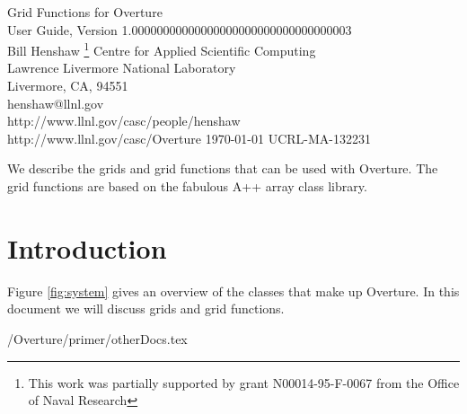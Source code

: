 \documentclass{article}
\newcommand{\primer}{\homeHenshaw/Overture/primer}
\begin{document}


\def\comma  {~~~,~~}
\def\uvd    {{\bf U}}
\def\ud     {{    U}}
\def\pd     {{    P}}
\def\calo{{\cal O}}


\vspace{5\baselineskip}
\begin{flushleft}
{\Large
Grid Functions for Overture\\
User Guide, Version 1.00000000000000000000000000000000003 \\
}
\vspace{2\baselineskip}
Bill Henshaw
\footnote{
        This work was partially
        supported by grant N00014-95-F-0067 from the Office of Naval
        Research
        } 
\vspace{\baselineskip}
Centre for Applied Scientific Computing \\
Lawrence Livermore National Laboratory    \\
Livermore, CA, 94551   \\
henshaw@llnl.gov \\
http://www.llnl.gov/casc/people/henshaw \\
http://www.llnl.gov/casc/Overture 
\vspace{\baselineskip}
\today
\vspace{\baselineskip}
UCRL-MA-132231

\vspace{4\baselineskip}

We describe the grids and grid functions that can be used with
Overture. The grid functions are based on the 
fabulous A++ array class library.
\end{flushleft}

\tableofcontents
\listoffigures

\vfill\eject

\section{Introduction}



Figure \ref{fig:system} gives an overview of the classes that make
up Overture. In this document we will discuss grids and grid functions.

 \primer/otherDocs.tex
\end{document}
